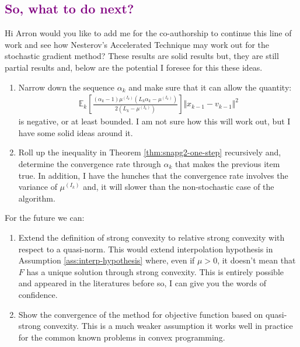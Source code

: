 \documentclass[12pt]{article}
\begin{document}
    \subsection{\textcolor{purple}{So, what to do next?}}
        Hi Arron would you like to add me for the co-authorship to continue this line of work and see how Nesterov's Accelerated Technique may work out for the stochastic gradient method? 
        These results are solid results but, they are still partial results and, below are the potential I foresee for this these ideas. 
        \begin{enumerate}
            \item Narrow down the sequence $\alpha_k$ and make sure that it can allow the quantity: 
            \begin{align*}
                \mathbb E_k\left[
                        \frac{(\alpha_k - 1)\mu^{(I_k)}\left(L_k\alpha_k - \mu^{(I_k)}\right)}{2\left(L_k - \mu^{(I_k)}\right)}
                    \right]\Vert x_{k - 1} - v_{k - 1} \Vert^2
            \end{align*}
            is negative, or at least bounded. I am not sure how this will work out, but I have some solid ideas around it. 
            \item Roll up the inequality in Theorem \ref{thm:snapg2-one-step} recursively and, determine the convergence rate through $\alpha_k$ that makes the previous item true. 
            In addition, I have the hunches that the convergence rate involves the variance of $\mu^{(I_k)}$ and, it will slower than the non-stochastic case of the algorithm. 
        \end{enumerate}
        For the future we can: 
        \begin{enumerate}
            \item Extend the definition of strong convexity to relative strong convexity with respect to a quasi-norm. This would extend interpolation hypothesis in Assumption \ref{ass:interp-hypothesis} where, even if $\mu > 0$, it doesn't mean that $F$ has a unique solution through strong convexity. This is entirely possible and appeared in the literatures before so, I can give you the words of confidence. 
            \item Show the convergence of the method for objective function based on quasi-strong convexity. This is a much weaker assumption it works well in practice for the common known problems in convex programming. 
        \end{enumerate}
    



\end{document}
